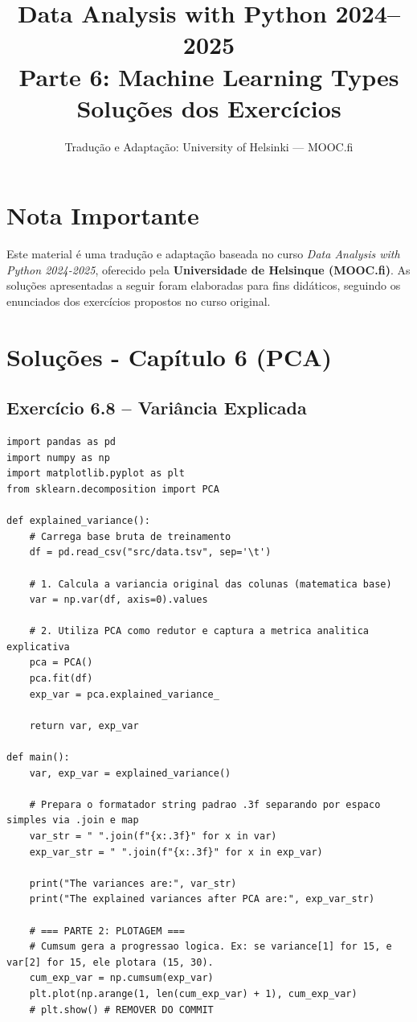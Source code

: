 \documentclass[11pt,a4paper]{article}
\title{\textbf{Data Analysis with Python 2024--2025}\\Parte 6: Machine Learning Types\\\large Soluções dos Exercícios}
\author{Tradução e Adaptação: University of Helsinki --- MOOC.fi}
\date{}
\begin{document}
\maketitle

\section*{Nota Importante}
Este material é uma tradução e adaptação baseada no curso \textit{Data Analysis with Python 2024-2025}, oferecido pela \textbf{Universidade de Helsinque (MOOC.fi)}. As soluções apresentadas a seguir foram elaboradas para fins didáticos, seguindo os enunciados dos exercícios propostos no curso original.

\tableofcontents
\newpage

\section{Soluções - Capítulo 6 (PCA)}

\subsection*{Exercício 6.8 -- Variância Explicada}

\begin{solucao}
\begin{lstlisting}
import pandas as pd
import numpy as np
import matplotlib.pyplot as plt
from sklearn.decomposition import PCA

def explained_variance():
    # Carrega base bruta de treinamento
    df = pd.read_csv("src/data.tsv", sep='\t')
    
    # 1. Calcula a variancia original das colunas (matematica base)
    var = np.var(df, axis=0).values
    
    # 2. Utiliza PCA como redutor e captura a metrica analitica explicativa
    pca = PCA()
    pca.fit(df)
    exp_var = pca.explained_variance_
    
    return var, exp_var

def main():
    var, exp_var = explained_variance()
    
    # Prepara o formatador string padrao .3f separando por espaco simples via .join e map
    var_str = " ".join(f"{x:.3f}" for x in var)
    exp_var_str = " ".join(f"{x:.3f}" for x in exp_var)
    
    print("The variances are:", var_str)
    print("The explained variances after PCA are:", exp_var_str)
    
    # === PARTE 2: PLOTAGEM ===
    # Cumsum gera a progressao logica. Ex: se variance[1] for 15, e var[2] for 15, ele plotara (15, 30).
    cum_exp_var = np.cumsum(exp_var)
    plt.plot(np.arange(1, len(cum_exp_var) + 1), cum_exp_var)
    # plt.show() # REMOVER DO COMMIT
\end{lstlisting}
\end{solucao}
\end{document}
